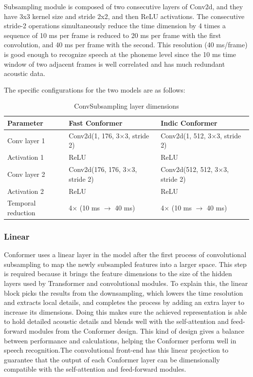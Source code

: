 Subsampling module is composed of two consecutive layers of Conv2d, and they have 3x3 kernel size and stride 2x2, and then ReLU activations. The consecutive stride-2 operations simultaneously reduce the time dimension by 4 times a sequence of 10 ms per frame is reduced to 20 ms per frame with the first convolution, and 40 ms per frame with the second. This resolution (40 ms/frame) is good enough to recognize speech at the phoneme level since the 10 ms time window of two adjacent frames is well correlated and has much redundant acoustic data.

The specific configurations for the two models are as follows:

\begin{table}[H]
\caption{ConvSubsampling layer dimensions}
\label{tab:convsubsampling_dimensions}
\centering
\begin{tabular}{|l|l|l|}
\hline
\textbf{Parameter} & \textbf{Fast Conformer} & \textbf{Indic Conformer} \\
\hline
Conv layer 1 & Conv2d(1, 176, 3$\times$3, stride 2) & Conv2d(1, 512, 3$\times$3, stride 2) \\
Activation 1 & ReLU & ReLU \\
Conv layer 2 & Conv2d(176, 176, 3$\times$3, stride 2) & Conv2d(512, 512, 3$\times$3, stride 2) \\
Activation 2 & ReLU & ReLU \\
Temporal reduction & 4$\times$ (10 ms $\to$ 40 ms) & 4$\times$ (10 ms $\to$ 40 ms) \\
\hline
\end{tabular}
\end{table}

\subsubsection{Linear}

Conformer uses a linear layer in the model after the first process of convolutional subsampling to map the newly subsampled features into a larger space. This step is required because it brings the feature dimensions to the size of the hidden layers used by Transformer and convolutional modules. To explain this, the linear block picks the results from the downsampling, which lowers the time resolution and extracts local details, and completes the process by adding an extra layer to increase its dimensions. Doing this makes sure the achieved representation is able to hold detailed acoustic details and blends well with the self-attention and feed-forward modules from the Conformer design. This kind of design gives a balance between performance and calculations, helping the Conformer perform well in speech recognition.The convolutional front-end has this linear projection to guarantee that the output of each Conformer layer can be dimensionally compatible with the self-attention and feed-forward modules.

